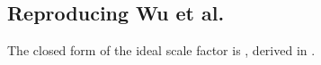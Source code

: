 \subsection{Reproducing Wu et al.}
\label{sec:results-reproduction}

The closed form of the ideal scale factor is , derived in .

